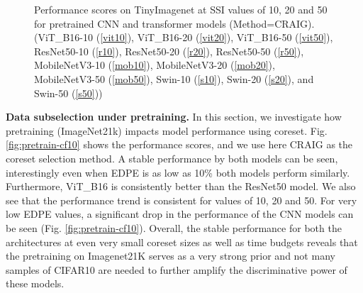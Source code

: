 \begin{figure}
\vspace{-1em}
\caption{Performance scores on TinyImagenet at SSI values of 10, 20 and 50 for pretrained CNN and transformer models (Method=CRAIG). (ViT\_B16-10 (\ref{vit10}), ViT\_B16-20 (\ref{vit20}), ViT\_B16-50 (\ref{vit50}), ResNet50-10 (\ref{r10}), ResNet50-20 (\ref{r20}), ResNet50-50 (\ref{r50}), MobileNetV3-10 (\ref{mob10}), MobileNetV3-20 (\ref{mob20}), MobileNetV3-50 (\ref{mob50}), Swin-10 (\ref{s10}), Swin-20 (\ref{s20}), and Swin-50 (\ref{s50}))}
\label{fig:pretrain-tim}
\end{figure}








































 \textbf{Data subselection under pretraining. } In this section, we investigate how pretraining (ImageNet21k) impacts model performance using coreset. Fig. \ref{fig:pretrain-cf10} shows the performance scores, and we use here CRAIG as the coreset selection method. A stable performance by both models can be seen, interestingly even when EDPE is as low as 10\% both models perform similarly. Furthermore, ViT\_B16 is consistently better than the ResNet50 model. We also see that the performance trend is consistent for  values of 10, 20 and 50. For very low EDPE values, a significant drop in the performance of the CNN models can be seen (Fig. \ref{fig:pretrain-cf10}). Overall, the stable performance for both the architectures at even very small coreset sizes as well as time budgets reveals that the pretraining on Imagenet21K serves as a very strong prior and not many samples of CIFAR10 are needed to further amplify the discriminative power of these models. 



